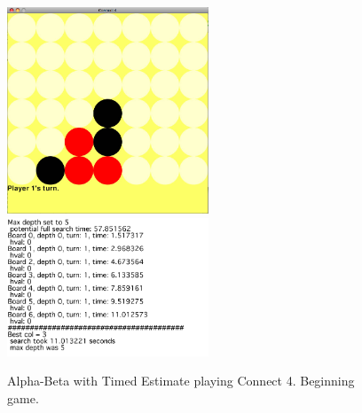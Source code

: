 \documentclass[12pt]{article}
\begin{document}

\begin{figure}[h!]
        \begin{center}
		\includegraphics[width=60mm]{report_images/abt_play.png}
		\includegraphics[width=60mm]{report_images/abt_play_text.png}
                	\caption{Alpha-Beta with Timed Estimate playing Connect 4. Beginning game.}
                	\label{abt_play}
        \end{center}
\end{figure}
\end{document}
